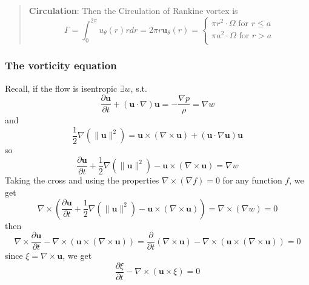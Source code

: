 

\begin{quote}
	\textbf{Circulation}:
Then the Circulation of Rankine vortex is
\begin{equation}
\Gamma
= \int_{0}^{2\pi} u_{\theta} (r) r dr
= 2\pi r \textbf{u}_\theta(r)
= \begin{cases}
\pi r^2 \cdot \Omega \text{ for } r \leq a\\
\pi a^2 \cdot \Omega \text{ for } r > a\\
\end{cases}
\end{equation}


\end{quote}



\subsubsection{The vorticity equation} %

Recall, if the flow is isentropic $\exists w$, s.t.
\begin{equation}
\frac{\partial \textbf{u}}{\partial t}
+ \left(\textbf{u}\cdot \nabla \right)\textbf{u}
= - \frac{\nabla p}{\rho}  = \nabla w
\end{equation}
and
\begin{equation}
\frac{1}{2}\nabla \left(\lVert \textbf{u}\rVert^2\right) = \textbf{u} \times \left(\nabla\times\textbf{u}\right) + \left(\textbf{u}\cdot \nabla\textbf{u}\right)\textbf{u}
\end{equation}
so 
\begin{equation}
\frac{\partial \textbf{u}}{\partial t} + \frac{1}{2}\nabla\left(\lVert \textbf{u}\rVert^2\right) - \textbf{u}\times\left(\nabla \times \textbf{u}\right) = \nabla w
\end{equation}
Taking the cross and using the properties $\nabla \times \left(\nabla f\right) = 0$ for any function $f$, we get
\begin{equation}
\nabla\times\left(
\frac{\partial \textbf{u}}{\partial t} + \frac{1}{2}\nabla\left(\lVert \textbf{u}\rVert^2\right) - \textbf{u}\times\left(\nabla \times \textbf{u}\right)\right)
= \nabla\times\left(
\nabla w
\right) = 0
\end{equation}
then
\begin{equation}
\nabla \times \frac{\partial \textbf{u}}{\partial t} - \nabla \times\left(\textbf{u}\times \left(\nabla \times\textbf{u}\right)\right)
=
\frac{\partial}{\partial t}\left( \nabla \times \textbf{u}\right) - \nabla \times\left(\textbf{u}\times \left(\nabla \times\textbf{u}\right)\right)
= 0
\end{equation}
since $\xi = \nabla \times \textbf{u}$, we get
\begin{equation}
\frac{\partial \xi}{\partial t} - \nabla \times\left(\textbf{u}\times \xi\right)
= 0
\end{equation}





